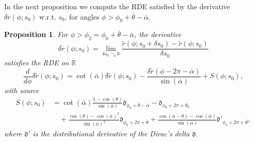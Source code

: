 \documentclass[reqno]{amsart}
\theoremstyle{definition} \newtheorem{definition}{Definition}[section]
\theoremstyle{definition} \newtheorem{remark}[definition]{Remark}
\theoremstyle{plain} \newtheorem{lemma}[definition]{Lemma}
\theoremstyle{plain} \newtheorem{proposition}[definition]{Proposition}
\theoremstyle{plain} \newtheorem{theorem}[definition]{Theorem}
\theoremstyle{plain} \newtheorem{corollary}[definition]{Corollary}
\theoremstyle{definition} \newtheorem{example}[definition]{Example}
\theoremstyle{plain} \newtheorem{claim}[clai]{Claim}
\theoremstyle{definition} \newtheorem{assumption}[definition]{Assumption}
\theoremstyle{definition} \newtheorem{observation}[definition]{Observation}
\newcommand{\R}{\mathbb{R}}
\newcommand{\1}{\mathbbm 1}
\newcommand{\Diracd}{\mathfrak{d}}
\numberwithin{equation}{section} %
\theoremstyle{plain} \newtheorem*{theorem*}{Theorem}
\theoremstyle{plain} \newtheorem{mthm}[maintheorem]{Main Theorem}
\theoremstyle{plain} \newtheorem*{mthm*}{Main Theorem}
\theoremstyle{plain} \newtheorem*{conjecture*}{Conjecture}
\theoremstyle{plain} \newtheorem{conjecture}[definition]{Conjecture}
\theoremstyle{plain} \newtheorem*{problem*}{Problem}
\begin{document}
In the next proposition we compute the RDE satisfied by the derivative $\delta \tilde r(\phi;s_0)$ w.r.t. $s_0$, for angles $\phi > \phi_0 + \bar \theta - \bar \alpha$.

\begin{proposition}
\label{Prop:equa_delta_tilde_r_segm}
For $\phi > \phi_2 = \phi_0 + \bar \theta - \bar \alpha$, the derivative 
$$
\delta \tilde r(\phi;s_0) = \lim_{\delta s_0 \searrow 0} \frac{\tilde r(\phi;s_0 + \delta s_0) - \tilde r(\phi;s_0)}{\delta s_0}
$$
satisfies the RDE on $\R$
\begin{equation*}
\frac{d}{d\phi} \delta \tilde r(\phi;s_0) = \cot(\bar \alpha) \delta \tilde r(\phi;s_0) - \frac{\delta \tilde r(\phi - 2\pi - \bar \alpha)}{\sin(\bar \alpha)} + S(\phi;s_0),
\end{equation*}
with source
\begin{align*}
S(\phi;s_0) &= \cot(\bar \alpha) \frac{1 - \cos(\theta)}{\sin(\bar \alpha)} \Diracd_{\phi_0 + \bar \theta - \bar \alpha} - \Diracd_{\phi_0 + 2\pi + \theta_0} \\
& \quad + \frac{\cos(\theta) - \cos(\bar \alpha)^2}{\sin(\bar \alpha)^2} \Diracd_{\phi_0 + 2\pi + \bar \theta} + \frac{\cos(\bar \alpha - \theta) - \cos(\bar \alpha)}{\sin(\bar \alpha)} \Diracd'_{\phi_0 + 2\pi + \bar \theta},
\end{align*}
where $\Diracd'$ is the distributional derivative of the Dirac's delta $\Diracd$.
\end{proposition}
\end{document}

